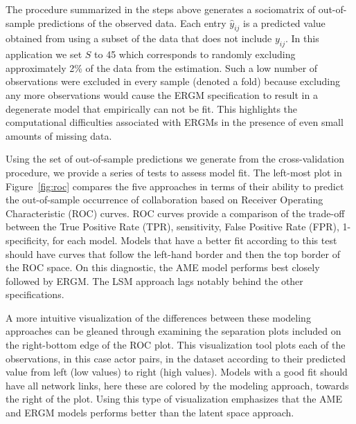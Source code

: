 \documentclass[12pt,pdflatex]{elsarticle}
\begin{document}
The procedure summarized in the steps above generates a sociomatrix of out-of-sample predictions of the observed data. Each entry $\hat y_{ij}$ is a predicted value obtained from using a subset of the data that does not include $y_{ij}$. In this application we set $S$ to 45 which corresponds to randomly excluding approximately 2\% of the data from the estimation. Such a low number of observations were excluded in every sample (denoted a fold) because excluding any more observations would cause the ERGM specification to result in a degenerate model that empirically can not be fit. This highlights the computational difficulties associated with ERGMs in the presence of even small amounts of missing data.

Using the set of out-of-sample predictions we generate from the cross-validation procedure, we provide a series of tests to assess model fit. The left-most plot in Figure~\ref{fig:roc} compares the five approaches in terms of their ability to predict the out-of-sample occurrence of collaboration based on Receiver Operating Characteristic (ROC) curves. ROC curves provide a comparison of the trade-off between the True Positive Rate (TPR), sensitivity, False Positive Rate (FPR), 1-specificity, for each model. Models that have a better fit according to this test should have curves that follow the left-hand border and then the top border of the ROC space. On this diagnostic, the AME model performs best closely followed by ERGM. The LSM approach lags notably behind the other specifications. 

A more intuitive visualization of the differences between these modeling approaches can be gleaned through examining the separation plots included on the right-bottom edge of the ROC plot. This visualization tool plots each of the observations, in this case actor pairs, in the dataset according to their predicted value from left (low values) to right (high values). Models with a good fit should have all network links, here these are colored by the modeling approach, towards the right of the plot. Using this type of visualization emphasizes that the AME and ERGM models performs better than the latent space approach.
\end{document}
